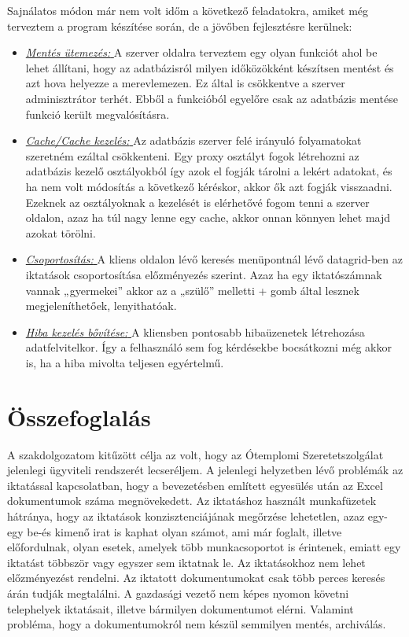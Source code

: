 \documentclass[
]{thesis-ekf}
\theoremstyle{definition}
\theoremstyle{remark}
\begin{document}
Sajnálatos módon már nem volt időm a következő feladatokra, amiket még terveztem a program készítése során, de a jövőben fejlesztésre kerülnek:
\begin{itemize}[leftmargin=0pt]
	\item \underline{\textit{Mentés ütemezés: }}A szerver oldalra terveztem egy olyan funkciót ahol be lehet állítani, hogy az adatbázisról milyen időközökként készítsen mentést és azt hova helyezze a merevlemezen. Ez által is csökkentve a szerver adminisztrátor terhét. Ebből a funkcióból egyelőre csak az adatbázis mentése funkció került megvalósításra. 
	\item \underline{\textit{Cache/Cache kezelés: }}Az adatbázis szerver felé irányuló folyamatokat szeretném ezáltal csökkenteni. Egy proxy osztályt fogok létrehozni az adatbázis kezelő osztályokból így azok el fogják tárolni a lekért adatokat, és ha nem volt módosítás a következő kéréskor, akkor ők azt fogják visszaadni. Ezeknek az osztályoknak a kezelését is elérhetővé fogom tenni a szerver oldalon, azaz ha túl nagy lenne egy cache, akkor onnan könnyen lehet majd azokat törölni.
	\item \underline{\textit{Csoportosítás: }}A kliens oldalon lévő keresés menüpontnál lévő datagrid-ben az iktatások csoportosítása előzményezés szerint. Azaz ha egy iktatószámnak vannak „gyermekei” akkor az a „szülő” melletti + gomb által lesznek megjeleníthetőek, lenyithatóak. 
	\item \underline{\textit{Hiba kezelés bővítése: }}A kliensben pontosabb hibaüzenetek létrehozása adatfelvitelkor. Így a felhasználó sem fog kérdésekbe bocsátkozni még akkor is, ha a hiba mivolta teljesen egyértelmű.
\end{itemize}
\chapter{Összefoglalás}
A szakdolgozatom kitűzött célja az volt, hogy az Ótemplomi Szeretetszolgálat jelenlegi ügyviteli rendszerét lecseréljem. A jelenlegi helyzetben lévő problémák az iktatással kapcsolatban, hogy a bevezetésben említett egyesülés után az Excel dokumentumok száma megnövekedett. Az iktatáshoz használt munkafüzetek hátránya, hogy az iktatások konzisztenciájának megőrzése lehetetlen, azaz egy-egy be-és kimenő irat is kaphat olyan számot, ami már foglalt, illetve előfordulnak, olyan esetek, amelyek több munkacsoportot is érintenek, emiatt egy iktatást többször vagy egyszer sem iktatnak le. Az iktatásokhoz nem lehet előzményezést rendelni. Az iktatott dokumentumokat csak több perces keresés árán tudják megtalálni. A gazdasági vezető nem képes nyomon követni telephelyek iktatásait, illetve bármilyen dokumentumot elérni.  Valamint probléma, hogy a dokumentumokról nem készül semmilyen mentés, archiválás.
\end{document}
